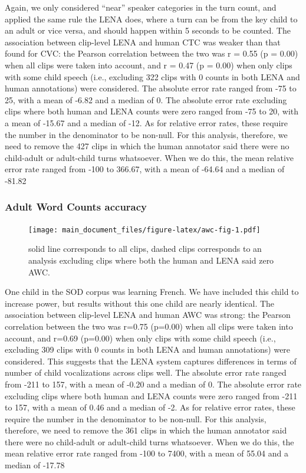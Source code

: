 \documentclass[english,floatsintext,man]{apa6}
\begin{document}
Again, we only considered \enquote{near} speaker categories in the turn
count, and applied the same rule the LENA does, where a turn can be from
the key child to an adult or vice versa, and should happen within 5
seconds to be counted. The association between clip-level LENA and human
CTC was weaker than that found for CVC: the Pearson correlation between
the two was r = 0.55 (p = 0.00) when all clips were taken into account,
and r = 0.47 (p = 0.00) when only clips with some child speech (i.e.,
excluding 322 clips with 0 counts in both LENA and human annotations)
were considered. The absolute error rate ranged from -75 to 25, with a
mean of -6.82 and a median of 0. The absolute error rate excluding clips
where both human and LENA counts were zero ranged from -75 to 20, with a
mean of -15.67 and a median of -12. As for relative error rates, these
require the number in the denominator to be non-null. For this analysis,
therefore, we need to remove the 427 clips in which the human annotator
said there were no child-adult or adult-child turns whatsoever. When we
do this, the mean relative error rate ranged from -100 to 366.67, with a
mean of -64.64 and a median of -81.82

\subsubsection{Adult Word Counts
accuracy}\label{adult-word-counts-accuracy}

\begin{figure}
\centering
\texttt{[image: main\_document\_files/figure-latex/awc-fig-1.pdf]}
\caption{\label{fig:awc-fig}solid line corresponds to all clips, dashed
clips corresponds to an analysis excluding clips where both the human
and LENA said zero AWC.}
\end{figure}

One child in the SOD corpus was learning French. We have included this
child to increase power, but results without this one child are nearly
identical. The association between clip-level LENA and human AWC was
strong: the Pearson correlation between the two was r=0.75 (p=0.00) when
all clips were taken into account, and r=0.69 (p=0.00) when only clips
with some child speech (i.e., excluding 309 clips with 0 counts in both
LENA and human annotations) were considered. This suggests that the LENA
system captures differences in terms of number of child vocalizations
across clips well. The absolute error rate ranged from -211 to 157, with
a mean of -0.20 and a median of 0. The absolute error rate excluding
clips where both human and LENA counts were zero ranged from -211 to
157, with a mean of 0.46 and a median of -2. As for relative error
rates, these require the number in the denominator to be non-null. For
this analysis, therefore, we need to remove the 361 clips in which the
human annotator said there were no child-adult or adult-child turns
whatsoever. When we do this, the mean relative error rate ranged from
-100 to 7400, with a mean of 55.04 and a median of -17.78
\end{document}
